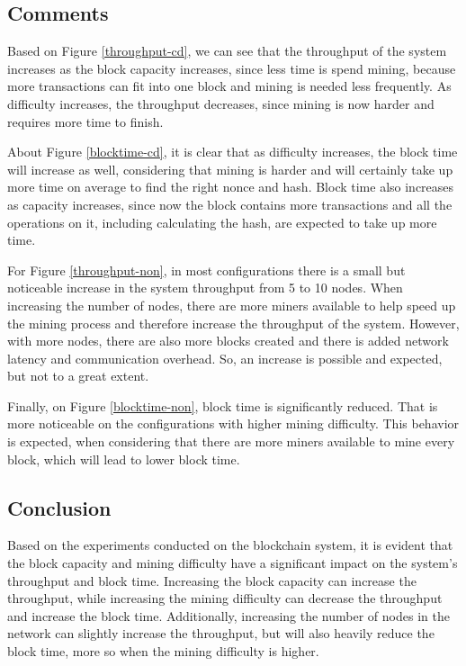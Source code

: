 \documentclass[conference]{IEEEtran}
\begin{document}
\subsection{Comments}
Based on Figure \ref{throughput-cd}, we can see that the throughput of the system increases as the block capacity increases, since less time is spend mining, because more transactions can fit into one block and mining is needed less frequently. As difficulty increases, the throughput decreases, since mining is now harder and requires more time to finish.

About Figure \ref{blocktime-cd}, it is clear that as difficulty increases, the block time will increase as well, considering that mining is harder and will certainly take up more time on average to find the right nonce and hash. Block time also increases as capacity increases, since now the block contains more transactions and all the operations on it, including calculating the hash, are expected to take up more time.

For Figure \ref{throughput-non}, in most configurations there is a small but noticeable increase in the system throughput from 5 to 10 nodes. When increasing the number of nodes, there are more miners available to help speed up the mining process and therefore increase the throughput of the system. However, with more nodes, there are also more blocks created and there is added network latency and communication overhead. So, an increase is possible and expected, but not to a great extent.

Finally, on Figure \ref{blocktime-non}, block time is significantly reduced. That is more noticeable on the configurations with higher mining difficulty. This behavior is expected, when considering that there are more miners available to mine every block, which will lead to lower block time.

\subsection{Conclusion}

Based on the experiments conducted on the blockchain system, it is evident that the block capacity and mining difficulty have a significant impact on the system's throughput and block time. Increasing the block capacity can increase the throughput, while increasing the mining difficulty can decrease the throughput and increase the block time. Additionally, increasing the number of nodes in the network can slightly increase the throughput, but will also heavily reduce the block time, more so when the mining difficulty is higher.
\end{document}
